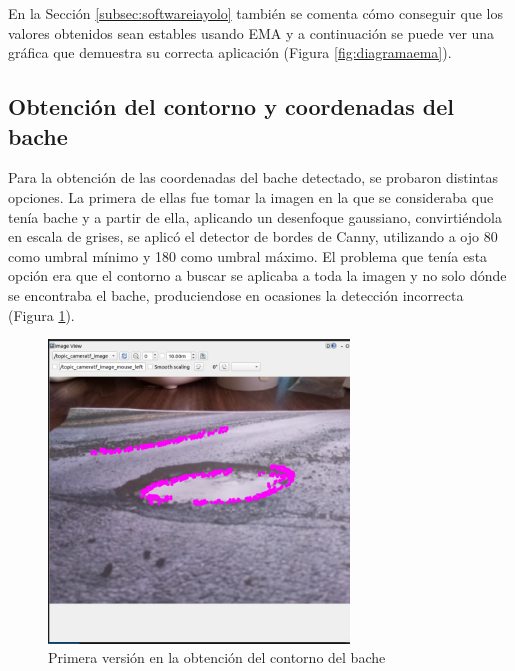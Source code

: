 En la Sección \ref{subsec:softwareiayolo} también se comenta cómo conseguir que los valores obtenidos sean estables usando \acs{EMA} y a continuación se puede ver una gráfica que demuestra su correcta aplicación (Figura \ref{fig:diagramaema}).



\subsection{Obtención del contorno y coordenadas del bache}
\label{subsec:expcontorno}

Para la obtención de las coordenadas del bache detectado, se probaron distintas opciones. La primera de ellas fue tomar la imagen en la que se consideraba que tenía bache y a partir de ella, aplicando un desenfoque gaussiano, convirtiéndola en escala de grises, se aplicó el detector de bordes de Canny, utilizando a ojo 80 como umbral mínimo y 180 como umbral máximo. El problema que tenía esta opción era que el contorno a buscar se aplicaba a toda la imagen y no solo dónde se encontraba el bache, produciendose en ocasiones la detección incorrecta (Figura \ref{fig:contornoerror}).

\begin{figure} [h!]
	\begin{center}
			\includegraphics[width=8cm]{figs/cap7/contornoerror.png}
		\end{center}
	\caption{Primera versión en la obtención del contorno del bache}
	\label{fig:contornoerror}
\end{figure}

